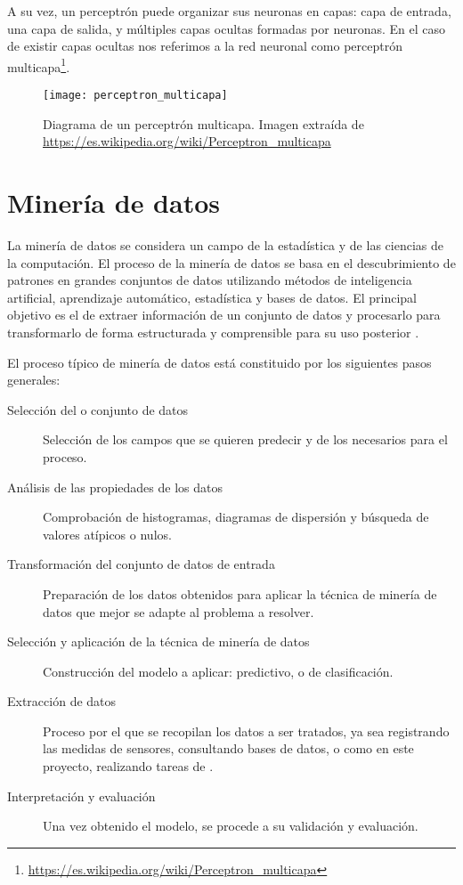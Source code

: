  A su vez, un perceptrón puede organizar sus neuronas en capas: capa de entrada, una capa de salida, y múltiples capas ocultas formadas por neuronas. En el caso de existir capas ocultas nos referimos a la red neuronal como perceptrón multicapa\footnote{\url{https://es.wikipedia.org/wiki/Perceptron\_multicapa}}.

\FloatBarrier
\begin{figure}[!h]
\centering
\texttt{[image: perceptron\_multicapa]}
\caption[Diagrama de un  perceptrón multicapa]{Diagrama de un  perceptrón multicapa. Imagen extraída de
\newline
\url{https://es.wikipedia.org/wiki/Perceptron\_multicapa}}
\label{fig}
\end{figure}
\FloatBarrier

\section{Minería de datos}

La minería de datos se considera un campo de la estadística y de las ciencias de la computación. El proceso de la minería de datos se basa en el descubrimiento de patrones en grandes conjuntos de datos utilizando métodos de inteligencia artificial, aprendizaje automático, estadística y bases de datos. El principal objetivo es el de extraer información de un conjunto de datos y procesarlo para transformarlo de forma estructurada y comprensible para su uso posterior \cite{wiki:mineria_de_datos}.

El proceso típico de minería de datos está constituido por los siguientes pasos generales:

\begin{description}
    \item[Selección del  o conjunto de datos] Selección de los campos que se quieren predecir y de los necesarios para el proceso.
    \item[Análisis de las propiedades de los datos] Comprobación de histogramas, diagramas de dispersión y búsqueda de valores atípicos o nulos.
    \item[Transformación del conjunto de datos de entrada] Preparación de los datos obtenidos para aplicar la técnica de minería de datos que mejor se adapte al problema a resolver.
    \item[Selección y aplicación de la técnica de minería de datos] Construcción del modelo a aplicar: predictivo, o de clasificación.
    \item[Extracción de datos] Proceso por el que se recopilan los datos a ser tratados, ya sea registrando las medidas de sensores, consultando bases de datos, o como en este proyecto, realizando tareas de .
    \item[Interpretación y evaluación] Una vez obtenido el modelo, se procede a su validación y evaluación.
\end{description}

